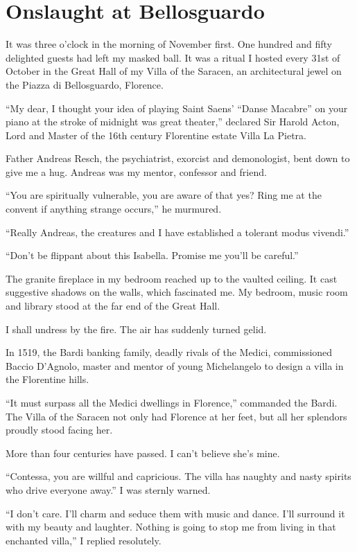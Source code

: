 \section{Onslaught at Bellosguardo}

It was three o’clock in the morning of November first. One hundred and fifty delighted guests had left my masked ball. It was a ritual I hosted every 31st of October in the Great Hall of my Villa of the Saracen, an architectural jewel on the Piazza di Bellosguardo, Florence.

``My dear, I thought your idea of playing Saint Saens’ ``Danse Macabre'' on your piano at the stroke of midnight was great theater,'' declared Sir Harold Acton, Lord and Master of the 16th century Florentine estate Villa La Pietra.

Father Andreas Resch, the psychiatrist, exorcist and demonologist, bent down to give me a hug. Andreas was my mentor, confessor and friend.

``You are spiritually vulnerable, you are aware of that yes? Ring me at the convent if anything strange occurs,'' he murmured.

``Really Andreas, the creatures and I have established a tolerant modus vivendi.''

``Don’t be flippant about this Isabella. Promise me you’ll be careful.''

The granite fireplace in my bedroom reached up to the vaulted ceiling. It cast suggestive shadows on the walls, which fascinated me. My bedroom, music room and library stood at the far end of the Great Hall.

I shall undress by the fire. The air has suddenly turned gelid.

In 1519, the Bardi banking family, deadly rivals of the Medici, commissioned Baccio D’Agnolo, master and mentor of young Michelangelo to design a villa in the Florentine hills.

``It must surpass all the Medici dwellings in Florence,'' commanded the Bardi. The Villa of the Saracen not only had Florence at her feet, but all her splendors proudly stood facing her.

More than four centuries have passed.  I can’t believe she’s mine.

``Contessa, you are willful and capricious. The villa has naughty and nasty spirits who drive everyone away.''  I was sternly warned.

``I don’t care. I’ll charm and seduce them with music and dance. I’ll surround it with my beauty and laughter. Nothing is going to stop me from living in that enchanted villa,'' I replied resolutely.

